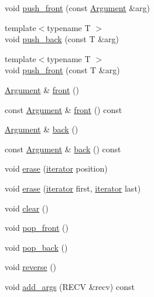 \begin{DoxyCompactItemize}
\item 
void \hyperlink{classVarArgs_1_1List_a5a29145952d61c69551cc0ee406524c6}{push\_\-front} (const \hyperlink{structVarArgs_1_1Argument}{Argument} \&arg)
\item 
{\footnotesize template$<$typename T $>$ }\\void \hyperlink{classVarArgs_1_1List_a9281cd0534a6a207cc53f85d6383da09}{push\_\-back} (const T \&arg)
\item 
{\footnotesize template$<$typename T $>$ }\\void \hyperlink{classVarArgs_1_1List_a970400bef449e31dd2be0ba3f082d7d6}{push\_\-front} (const T \&arg)
\item 
\hyperlink{structVarArgs_1_1Argument}{Argument} \& \hyperlink{classVarArgs_1_1List_a26869ef6dc59bd6289cca40aa896f069}{front} ()
\item 
const \hyperlink{structVarArgs_1_1Argument}{Argument} \& \hyperlink{classVarArgs_1_1List_aec86265b938450f64beaf6f14115806d}{front} () const 
\item 
\hyperlink{structVarArgs_1_1Argument}{Argument} \& \hyperlink{classVarArgs_1_1List_a3d3c89c7cb5a06ded7efee9e55497fa9}{back} ()
\item 
const \hyperlink{structVarArgs_1_1Argument}{Argument} \& \hyperlink{classVarArgs_1_1List_a84709d74fae8987fcdd17aa8f1afe4b4}{back} () const 
\item 
void \hyperlink{classVarArgs_1_1List_aff88043b8fd94b37279562c24739d9e5}{erase} (\hyperlink{classVarArgs_1_1List_a7b3d64cd6c8b24e05929cb79fde1049d}{iterator} position)
\item 
void \hyperlink{classVarArgs_1_1List_a44333fb0e829973f9df46bc7230996ff}{erase} (\hyperlink{classVarArgs_1_1List_a7b3d64cd6c8b24e05929cb79fde1049d}{iterator} first, \hyperlink{classVarArgs_1_1List_a7b3d64cd6c8b24e05929cb79fde1049d}{iterator} last)
\item 
void \hyperlink{classVarArgs_1_1List_ac8bb3912a3ce86b15842e79d0b421204}{clear} ()
\item 
void \hyperlink{classVarArgs_1_1List_a56f4ffbc6fd414b3c02a6c368e99594f}{pop\_\-front} ()
\item 
void \hyperlink{classVarArgs_1_1List_a058bda4957df6a97b1ea6c9fd783f672}{pop\_\-back} ()
\item 
void \hyperlink{classVarArgs_1_1List_a310c0bebc002158f5646a91d60e4dc89}{reverse} ()
\item 
void \hyperlink{classVarArgs_1_1List_a558d5df5a983784e0e3e7b29f1d43fb1}{add\_\-args} (RECV \&recv) const 
\end{DoxyCompactItemize}
